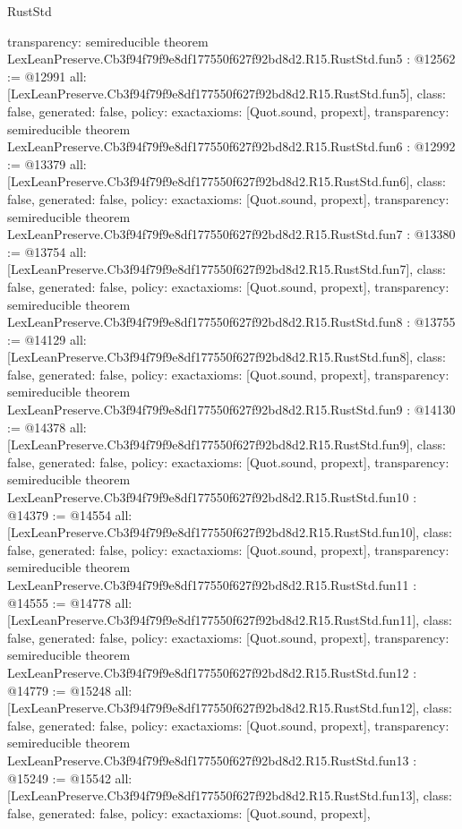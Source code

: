 \begin{lexlean}{RustStd}
\begin{coremodule}
{  transparency: semireducible
}
theorem LexLeanPreserve.Cb3f94f79f9e8df177550f627f92bd8d2.R15.RustStd.fun5 : @12562 := @12991 {
  all: [LexLeanPreserve.Cb3f94f79f9e8df177550f627f92bd8d2.R15.RustStd.fun5],
  class: false,
  generated: false,
  policy: exact{axioms: [Quot.sound, propext]},
  transparency: semireducible
}
theorem LexLeanPreserve.Cb3f94f79f9e8df177550f627f92bd8d2.R15.RustStd.fun6 : @12992 := @13379 {
  all: [LexLeanPreserve.Cb3f94f79f9e8df177550f627f92bd8d2.R15.RustStd.fun6],
  class: false,
  generated: false,
  policy: exact{axioms: [Quot.sound, propext]},
  transparency: semireducible
}
theorem LexLeanPreserve.Cb3f94f79f9e8df177550f627f92bd8d2.R15.RustStd.fun7 : @13380 := @13754 {
  all: [LexLeanPreserve.Cb3f94f79f9e8df177550f627f92bd8d2.R15.RustStd.fun7],
  class: false,
  generated: false,
  policy: exact{axioms: [Quot.sound, propext]},
  transparency: semireducible
}
theorem LexLeanPreserve.Cb3f94f79f9e8df177550f627f92bd8d2.R15.RustStd.fun8 : @13755 := @14129 {
  all: [LexLeanPreserve.Cb3f94f79f9e8df177550f627f92bd8d2.R15.RustStd.fun8],
  class: false,
  generated: false,
  policy: exact{axioms: [Quot.sound, propext]},
  transparency: semireducible
}
theorem LexLeanPreserve.Cb3f94f79f9e8df177550f627f92bd8d2.R15.RustStd.fun9 : @14130 := @14378 {
  all: [LexLeanPreserve.Cb3f94f79f9e8df177550f627f92bd8d2.R15.RustStd.fun9],
  class: false,
  generated: false,
  policy: exact{axioms: [Quot.sound, propext]},
  transparency: semireducible
}
theorem LexLeanPreserve.Cb3f94f79f9e8df177550f627f92bd8d2.R15.RustStd.fun10 : @14379 := @14554 {
  all: [LexLeanPreserve.Cb3f94f79f9e8df177550f627f92bd8d2.R15.RustStd.fun10],
  class: false,
  generated: false,
  policy: exact{axioms: [Quot.sound, propext]},
  transparency: semireducible
}
theorem LexLeanPreserve.Cb3f94f79f9e8df177550f627f92bd8d2.R15.RustStd.fun11 : @14555 := @14778 {
  all: [LexLeanPreserve.Cb3f94f79f9e8df177550f627f92bd8d2.R15.RustStd.fun11],
  class: false,
  generated: false,
  policy: exact{axioms: [Quot.sound, propext]},
  transparency: semireducible
}
theorem LexLeanPreserve.Cb3f94f79f9e8df177550f627f92bd8d2.R15.RustStd.fun12 : @14779 := @15248 {
  all: [LexLeanPreserve.Cb3f94f79f9e8df177550f627f92bd8d2.R15.RustStd.fun12],
  class: false,
  generated: false,
  policy: exact{axioms: [Quot.sound, propext]},
  transparency: semireducible
}
theorem LexLeanPreserve.Cb3f94f79f9e8df177550f627f92bd8d2.R15.RustStd.fun13 : @15249 := @15542 {
  all: [LexLeanPreserve.Cb3f94f79f9e8df177550f627f92bd8d2.R15.RustStd.fun13],
  class: false,
  generated: false,
  policy: exact{axioms: [Quot.sound, propext]},
}
\end{coremodule}
\end{lexlean}
